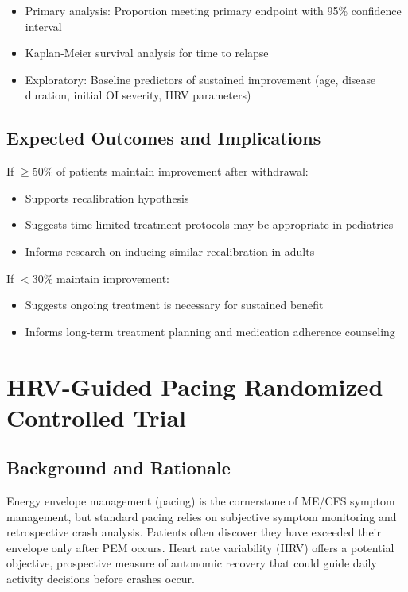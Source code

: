 \begin{itemize}
    \item Primary analysis: Proportion meeting primary endpoint with 95\% confidence interval
    \item Kaplan-Meier survival analysis for time to relapse
    \item Exploratory: Baseline predictors of sustained improvement (age, disease duration, initial OI severity, HRV parameters)
\end{itemize}

\subsection{Expected Outcomes and Implications}

If $\geq$50\% of patients maintain improvement after withdrawal:
\begin{itemize}
    \item Supports recalibration hypothesis
    \item Suggests time-limited treatment protocols may be appropriate in pediatrics
    \item Informs research on inducing similar recalibration in adults
\end{itemize}

If $<$30\% maintain improvement:
\begin{itemize}
    \item Suggests ongoing treatment is necessary for sustained benefit
    \item Informs long-term treatment planning and medication adherence counseling
\end{itemize}

\section{HRV-Guided Pacing Randomized Controlled Trial}
\label{sec:hrv-pacing-rct}

\subsection{Background and Rationale}

Energy envelope management (pacing) is the cornerstone of ME/CFS symptom management, but standard pacing relies on subjective symptom monitoring and retrospective crash analysis. Patients often discover they have exceeded their envelope only after PEM occurs. Heart rate variability (HRV) offers a potential objective, prospective measure of autonomic recovery that could guide daily activity decisions before crashes occur.

